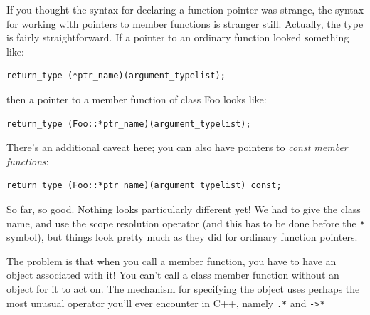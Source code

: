 \documentclass[a4paper]{scrartcl}
\begin{document}
If you thought the syntax for declaring a function pointer was strange, the syntax for working with pointers to member functions is stranger still. Actually, the type is fairly straightforward. If a pointer to an ordinary function looked something like:
\begin{verbatim}
return_type (*ptr_name)(argument_typelist);
\end{verbatim}
then a pointer to a member function of class Foo looks like:
\begin{verbatim}
return_type (Foo::*ptr_name)(argument_typelist);
\end{verbatim}
There's an additional caveat here; you can also have pointers to \emph{const member functions}:
\begin{verbatim}
return_type (Foo::*ptr_name)(argument_typelist) const;
\end{verbatim}

So far, so good. Nothing looks particularly different yet! We had to give the class name, and use the scope resolution operator (and this has to be done before the \verb|*| symbol), but things look pretty much as they did for ordinary function pointers.

The problem is that when you call a member function, you have to have an object associated with it! You can't call a class member function without an object for it to act on. The mechanism for specifying the object uses perhaps the most unusual operator you'll ever encounter in C++, namely \verb|.*| and \verb|->*|
\end{document}
